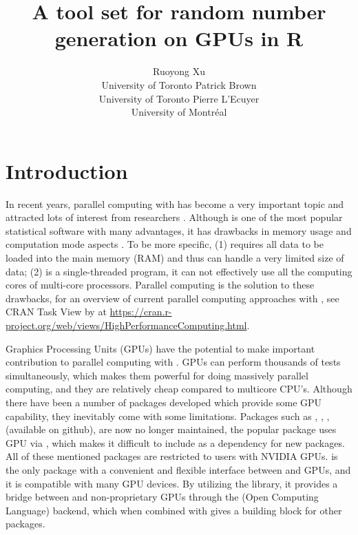 \documentclass[article,nojss]{jss}\usepackage[]{graphicx}\usepackage[]{color}
\author{Ruoyong Xu\\University of Toronto
   \And Patrick Brown\\University of Toronto
   \And Pierre L’Ecuyer\\University of Montr\'eal}
\title{A tool set for random number generation on GPUs in R}
\begin{document}




\section[Introduction]{Introduction}

\begin{leftbar}
% 

In recent years, parallel computing with  \citep{r2021} has become a very important topic and attracted lots of interest from researchers \citep[see][for a review]{eddelbuettel2021parallel}. Although  is one of the most popular statistical software with many advantages, it has drawbacks in memory usage and computation mode aspects \citep{zhao_2016}. To be more specific, (1)  requires all data to be loaded into the main memory (RAM) and thus can handle a very limited size of data; (2)  is a single-threaded program, it can not effectively use all the computing cores of multi-core processors. Parallel computing is the solution to these drawbacks, for an overview of current parallel computing approaches with , see CRAN Task View by \citet{cran2021} at \url{https://cran.r-project.org/web/views/HighPerformanceComputing.html}. 

Graphics Processing Units (GPUs) have the potential to make important contribution to parallel computing with . GPUs can perform thousands of tests simultaneously, which makes them powerful for doing massively parallel computing, and they are relatively cheap compared to multicore CPU's. Although there have been a number of  packages developed which provide some GPU capability, they inevitably come with some limitations. Packages such as , , ,  (available on github), are now no longer maintained, the popular  \citep{tensorflow1} package uses GPU via , which makes it difficult to include as a dependency for new  packages. All of these mentioned packages are restricted to  users with NVIDIA GPUs.  \citep{gpur1} is the only  package with a convenient and flexible interface between  and GPUs, and it is compatible with many GPU devices. By utilizing the  \citep*{rupp2016viennacl} library, it provides a bridge between  and non-proprietary GPUs through the  (Open Computing Language) backend, which when combined with  \citep{rcpp1} gives a building block for other  packages. 


\end{leftbar}
\end{document}
